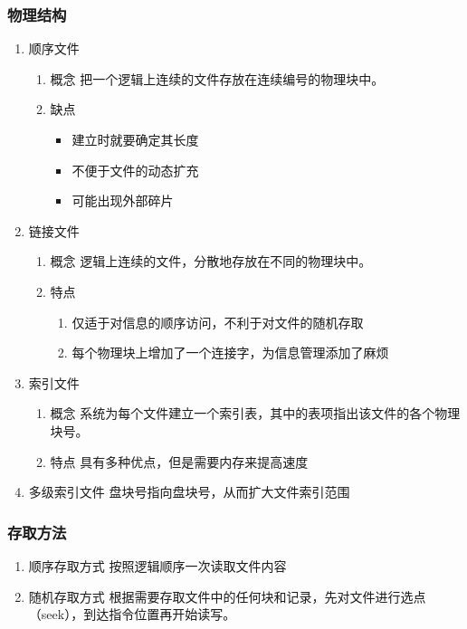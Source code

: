 \documentclass[11pt]{article}
\begin{document}
\subsubsection{物理结构}
\label{sec-4-2-2}
\begin{enumerate}
\item 顺序文件
\label{sec-4-2-2-1}
\begin{enumerate}
\item 概念
\label{sec-4-2-2-1-1}
把一个逻辑上连续的文件存放在连续编号的物理块中。
\item 缺点
\label{sec-4-2-2-1-2}
\begin{itemize}
\item 建立时就要确定其长度
\item 不便于文件的动态扩充
\item 可能出现外部碎片
\end{itemize}
\end{enumerate}
\item 链接文件
\label{sec-4-2-2-2}
\begin{enumerate}
\item 概念
\label{sec-4-2-2-2-1}
逻辑上连续的文件，分散地存放在不同的物理块中。
\item 特点
\label{sec-4-2-2-2-2}
\begin{enumerate}
\item 仅适于对信息的顺序访问，不利于对文件的随机存取
\item 每个物理块上增加了一个连接字，为信息管理添加了麻烦
\end{enumerate}
\end{enumerate}
\item 索引文件
\label{sec-4-2-2-3}
\begin{enumerate}
\item 概念
\label{sec-4-2-2-3-1}
系统为每个文件建立一个索引表，其中的表项指出该文件的各个物理块号。
\item 特点
\label{sec-4-2-2-3-2}
具有多种优点，但是需要内存来提高速度
\end{enumerate}
\item 多级索引文件
\label{sec-4-2-2-4}
盘块号指向盘块号，从而扩大文件索引范围
\end{enumerate}
\subsubsection{存取方法}
\label{sec-4-2-3}
\begin{enumerate}
\item 顺序存取方式
\label{sec-4-2-3-1}
按照逻辑顺序一次读取文件内容
\item 随机存取方式
\label{sec-4-2-3-2}
根据需要存取文件中的任何块和记录，先对文件进行选点（seek），到达指令位置再开始读写。
\end{enumerate}
\end{document}
